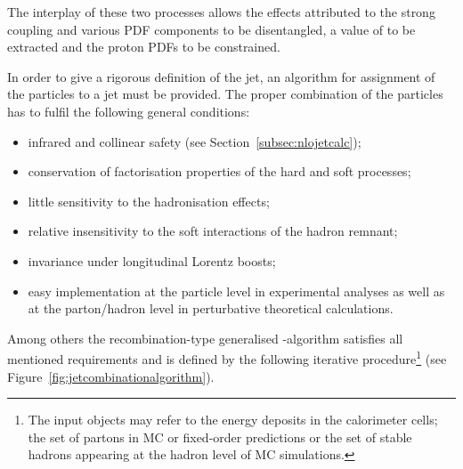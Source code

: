 The interplay of these two processes allows the effects attributed to the strong coupling and various PDF components to be disentangled, a value of \asz to be extracted and the proton PDFs to be constrained.

In order to give a rigorous definition of the jet, an algorithm for assignment of the particles to a jet must be provided. The proper combination of the particles has to fulfil the following general conditions:
\begin{itemize}
	\item infrared and collinear safety (see Section~\ref{subsec:nlojetcalc});
	\item conservation of factorisation properties of the hard and soft processes;
	\item little sensitivity to the hadronisation effects;
	\item relative insensitivity to the soft interactions of the hadron remnant;
	\item invariance under longitudinal Lorentz boosts;
	\item easy implementation at the particle level in experimental analyses as well as at the parton/hadron level in perturbative theoretical calculations.
\end{itemize}
Among others the recombination-type generalised \kt-algorithm satisfies all mentioned requirements and is defined by the following iterative procedure\footnote{The input objects may refer to the energy deposits in the calorimeter cells; the set of partons in MC or fixed-order predictions or the set of stable hadrons appearing at the hadron level of MC simulations.} (see Figure~\ref{fig:jetcombinationalgorithm}).
